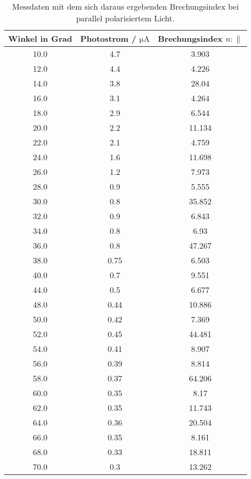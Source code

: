\begin{table}[H]
    \centering
    \caption{Messdaten mit dem sich daraus ergebenden Brechungsindex bei parallel polarisiertem Licht.}
    \label{tab:ppolMess}
    \begin{tabular}{c c c}
        \toprule
        Winkel in Grad & Photostrom / $\si{\micro\ampere}$  & Brechungsindex $n:\parallel$ \\
        \midrule
        10.0  &  4.7  &  3.903  \\
        12.0  &  4.4  &  4.226  \\
        14.0  &  3.8  &  28.04  \\
        16.0  &  3.1  &  4.264  \\
        18.0  &  2.9  &  6.544  \\
        20.0  &  2.2  &  11.134  \\
        22.0  &  2.1  &  4.759  \\
        24.0  &  1.6  &  11.698  \\
        26.0  &  1.2  &  7.973  \\
        28.0  &  0.9  &  5.555  \\
        30.0  &  0.8  &  35.852  \\
        32.0  &  0.9  &  6.843  \\
        34.0  &  0.8  &  6.93  \\
        36.0  &  0.8  &  47.267  \\
        38.0  &  0.75  &  6.503  \\
        40.0  &  0.7  &  9.551  \\
        44.0  &  0.5  &  6.677  \\
        48.0  &  0.44  &  10.886  \\
        50.0  &  0.42  &  7.369  \\
        52.0  &  0.45  &  44.481  \\
        54.0  &  0.41  &  8.907  \\
        56.0  &  0.39  &  8.814  \\
        58.0  &  0.37  &  64.206  \\
        60.0  &  0.35  &  8.17  \\
        62.0  &  0.35  &  11.743  \\
        64.0  &  0.36  &  20.504  \\
        66.0  &  0.35  &  8.161  \\
        68.0  &  0.33  &  18.811  \\
        70.0  &  0.3  &  13.262  \\

\end{tabular}
\end{table}
